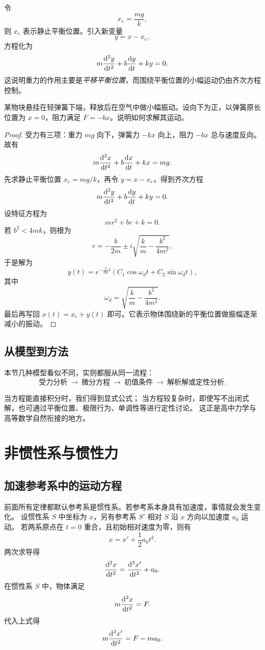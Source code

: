 令
\[
  x_e=\frac{mg}{k},
\]
则 $x_e$ 表示静止平衡位置。引入新变量
\[
  y=x-x_e,
\]
方程化为
\[
  m\dv[2]{y}{t}+b\dv{y}{t}+ky=0.
\]
这说明重力的作用主要是\emph{平移平衡位置}，而围绕平衡位置的小幅运动仍由齐次方程控制。

\begin{example}[带阻尼的竖直弹簧]
某物块悬挂在轻弹簧下端，释放后在空气中做小幅振动。设向下为正，以弹簧原长位置为 $x=0$，阻力满足 $F=-b\dot{x}$。说明如何求解其运动。
\end{example}

\begin{proof}
受力有三项：重力 $mg$ 向下，弹簧力 $-kx$ 向上，阻力 $-b\dot{x}$ 总与速度反向。故有
\[
  m\dv[2]{x}{t}+b\dv{x}{t}+kx=mg.
\]
先求静止平衡位置 $x_e=mg/k$，再令 $y=x-x_e$，得到齐次方程
\[
  m\dv[2]{y}{t}+b\dv{y}{t}+ky=0.
\]
设特征方程为
\[
  mr^2+br+k=0.
\]
若 $b^2<4mk$，则根为
\[
  r=-\frac{b}{2m}\pm i\sqrt{\frac{k}{m}-\frac{b^2}{4m^2}},
\]
于是解为
\[
  y(t)=e^{-\frac{b}{2m}t}\left(C_1\cos \omega_d t+C_2\sin \omega_d t\right),
\]
其中
\[
  \omega_d=\sqrt{\frac{k}{m}-\frac{b^2}{4m^2}}.
\]
最后再写回 $x(t)=x_e+y(t)$ 即可。它表示物体围绕新的平衡位置做振幅逐渐减小的振动。
\end{proof}

\subsection{从模型到方法}

本节几种模型看似不同，实则都服从同一流程：
\[
  \text{受力分析}\ \longrightarrow\ \text{微分方程}\ \longrightarrow\ \text{初值条件}\ \longrightarrow\ \text{解析解或定性分析}.
\]

当方程能直接积分时，我们得到显式公式；
当方程较复杂时，即使写不出闭式解，也可通过平衡位置、极限行为、单调性等进行定性讨论。
这正是高中力学与高等数学自然衔接的地方。

\section{非惯性系与惯性力}
\subsection{加速参考系中的运动方程}

前面所有定律都默认参考系是惯性系。若参考系本身具有加速度，事情就会发生变化。
设惯性系 $S$ 中坐标为 $x$，另有参考系 $S'$ 相对 $S$ 沿 $x$ 方向以加速度 $a_0$ 运动。
若两系原点在 $t=0$ 重合，且初始相对速度为零，则有
\[
  x=x'+\frac{1}{2}a_0 t^2.
\]
两次求导得
\[
  \dv[2]{x}{t}=\dv[2]{x'}{t}+a_0.
\]
在惯性系 $S$ 中，物体满足
\[
  m\dv[2]{x}{t}=F.
\]
代入上式得
\[
  m\dv[2]{x'}{t}=F-ma_0.
\]

